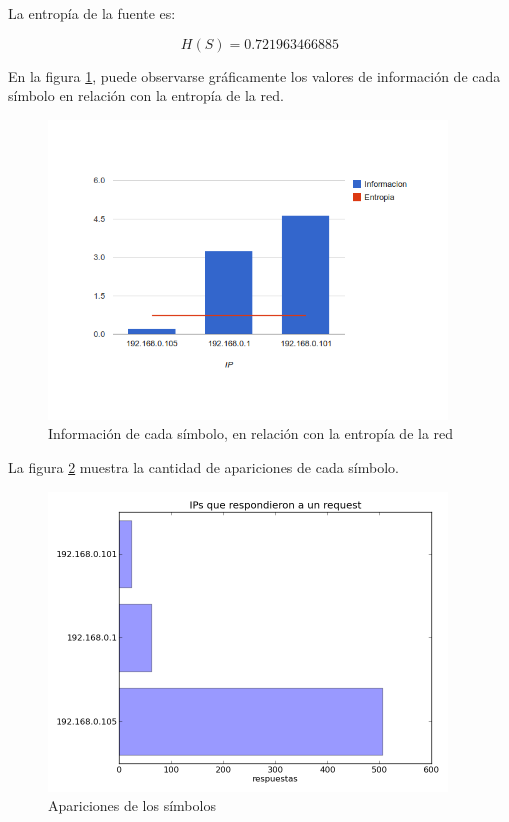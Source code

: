 \documentclass{article}
\begin{document}
\vskip10pt

La entropía de la fuente es:

$$H(S) = 0.721963466885$$

En la figura \ref{fig:red1repliers:infoentro}, puede observarse gráficamente
los valores de información de cada símbolo en relación con la entropía de la
red.

\begin{figure}[h!]
    \centering                                                       
    \includegraphics[width=300pt]{respuestas1.png}
    \caption{Información de cada símbolo, en relación con la
        entropía de la red}
    \label{fig:red1repliers:infoentro}
\end{figure}

La figura \ref{fig:red1repliers:count} muestra la cantidad de apariciones de
cada símbolo.

\begin{figure}[h!]
    \centering
    \includegraphics[width=300pt]{red1repliers.png}
    \caption{Apariciones de los símbolos}
    \label{fig:red1repliers:count}
\end{figure}
\end{document}
